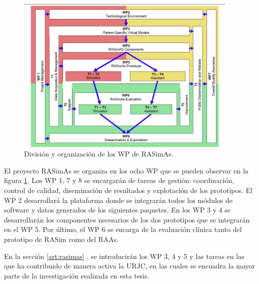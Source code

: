 
\begin{figure}
    \centering
    \includegraphics[width=0.95\textwidth]{IMG/wp_overview.jpg}
    \caption{División y organización de los \acl{WP} de \acs{RASimAs}.}
    \label{fig:wp_rasimas}
\end{figure}

El proyecto \ac{RASimAs} se organiza en los ocho \ac{WP} que se pueden observar en la figura \ref{fig:wp_rasimas}. Los \ac{WP} 1, 7 y 8 se encargarán de tareas de gestión: coordinación, control de calidad, diseminación de resultados y explotación de los prototipos. El \ac{WP} 2 desarrollará la plataforma donde se integrarán todos los módulos de software y datos generados de los siguientes paquetes. En los \ac{WP} 3 y 4 se desarrollarán los componentes necesarios de los dos prototipos que se integrarán en el \ac{WP} 5. Por último, el \ac{WP} 6 se encarga de la evaluación clínica tanto del prototipo de \ac{RASim} como del \ac{RAAs}. 

En la sección \ref{art:rasimas} , se introducirán los \ac{WP} 3, 4 y 5 y las tareas en las que ha contribuido de manera activa la \ac{URJC}, en las cuales se encuadra la mayor parte de la investigación realizada en esta tesis.


